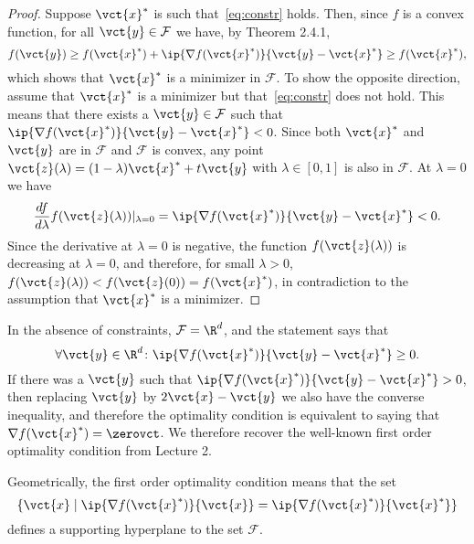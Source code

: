 \begin{proof}
 Suppose $\vct{x}^*$ is such that~\eqref{eq:constr} holds. Then, since $f$ is a convex function,
 for all $\vct{y}\in \mathcal{F}$ we have, by Theorem 2.4.1,
 \begin{equation*}
  f(\vct{y})\geq f(\vct{x}^*)+\ip{\nabla f(\vct{x}^*)}{\vct{y}-\vct{x}^*} \geq f(\vct{x}^*),
 \end{equation*}
which shows that $\vct{x}^*$ is a minimizer in $\mathcal{F}$. To show the opposite direction, assume that $\vct{x}^*$ is a minimizer but that~\eqref{eq:constr} does not hold. This means that there exists a $\vct{y}\in \mathcal{F}$ such that $\ip{\nabla f(\vct{x}^*)}{\vct{y}-\vct{x}^*}<0$. Since both $\vct{x}^*$ and $\vct{y}$ are in $\mathcal{F}$ and $\mathcal{F}$ is convex, any point $\vct{z}(\lambda)=(1-\lambda)\vct{x}^*+t\vct{y}$ with $\lambda\in [0,1]$ is also in $\mathcal{F}$. At $\lambda=0$ we have
\begin{equation*}
 \frac{df}{d\lambda}f(\vct{z}(\lambda))|_{\lambda=0} = \ip{\nabla f(\vct{x}^*)}{\vct{y}-\vct{x}^*}<0.
\end{equation*}
Since the derivative at $\lambda=0$ is negative, the function $f(\vct{z}(\lambda))$ is decreasing at $\lambda=0$, and therefore, for small $\lambda>0$, $f(\vct{z}(\lambda))<f(\vct{z}(0))=f(\vct{x}^*)$, in contradiction to the assumption that $\vct{x}^*$ is a minimizer.
\end{proof}

\begin{example}
 In the absence of constraints, $\mathcal{F}=\R^d$, and the statement says that
 \begin{equation*}
  \forall \vct{y}\in \R^d\colon \ip{\nabla f(\vct{x}^*)}{\vct{y}-\vct{x}^*}\geq 0.
 \end{equation*}
If there was a $\vct{y}$ such that $\ip{\nabla f(\vct{x}^*)}{\vct{y}-\vct{x}^*}>0$, then replacing $\vct{y}$ by $2\vct{x}-\vct{y}$ we also have the converse inequality, and therefore the optimality condition is equivalent to saying that $\nabla f(\vct{x}^*)=\zerovct$. We therefore recover the well-known first order optimality condition from Lecture 2. 
\end{example}

Geometrically, the first order optimality condition means that the set
\begin{equation*}
 \{\vct{x}\mid \ip{\nabla f(\vct{x}^*)}{\vct{x}}=\ip{\nabla f(\vct{x}^*)}{\vct{x}^*}\}
\end{equation*}
defines a supporting hyperplane to the set $\mathcal{F}$.

